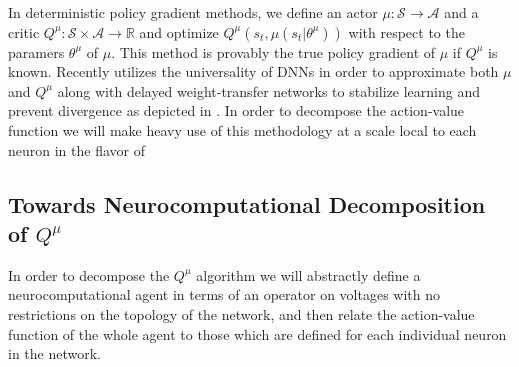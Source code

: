\documentclass{article} %
\numberwithin{equation}{subsection}
\numberwithin{theorem}{subsection}
\def\scripta{{\mathcal A}}
\def\scripts{{\mathcal S}}
\begin{document}
In deterministic policy gradient methods, we define an actor $\mu: \scripts \to \scripta$ and a critic $Q^\mu: \scripts \times \scripta \to \mathbb{R}$ and optimize $Q^\mu(s_t, \mu(s_t | \theta^{\mu}))$ with respect to the paramers $\theta^\mu$ of $\mu.$ This method is provably the true policy gradient of $\mu$ if $Q^\mu$ is known. Recently  utilizes the universality of DNNs in order to approximate both $\mu$ and $Q^\mu$ along with delayed weight-transfer networks to stabilize learning and  prevent divergence as depicted in . In order to decompose the action-value function we will make heavy use of this methodology at a scale local to each neuron in the flavor of 

\subsection{Towards Neurocomputational Decomposition of $Q^\mu$}

In order to decompose the $Q^\mu$ algorithm we will abstractly define a neurocomputational agent in terms of an operator on voltages with no restrictions on the topology of the network, and then relate the action-value function of the whole agent to those which are defined for each individual neuron in the network.
\end{document}
